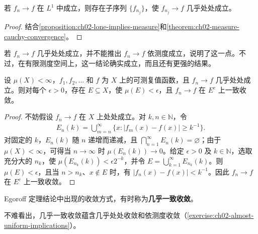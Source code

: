 \documentclass[../../main.tex]{subfiles}%
\begin{document}
\begin{corollary}\label{corollary:ch02-lone-ae-subsequence}
若 $f_n\to f$ 在 $L^1$ 中成立，则存在子序列 $\{f_{n_j}\}$，使 $f_{n_j}\to f$ 几乎处处成立。
\end{corollary}
\begin{proof}
结合\cref{proposition:ch02-lone-implies-measure}和\cref{theorem:ch02-measure-cauchy-convergence}。
\end{proof}
若 $f_n\to f$ 几乎处处成立，并不能推出 $f_n\to f$ 依测度成立，说明了这一点。不过，在有限测度空间上，这一结论确实成立，而且还有更强的结果。
\begin{theorem}[Egoroff 定理]\label{theorem:ch02-egoroff}
设 $\mu(X)<\infty$，$f_1,f_2,\ldots$ 和 $f$ 为 $X$ 上的可测复值函数，且 $f_n\to f$ 几乎处处成立。则对每个 $\epsilon>0$，存在 $E\subseteq X$，使 $\mu(E)<\epsilon$，且 $f_n\to f$ 在 $E^c$ 上一致收敛。
\end{theorem}
\begin{proof}
不妨假设 $f_n\to f$ 在 $X$ 上处处成立。对 $k,n\in\mathbb{N}$，令
\begin{align*}
E_n(k)=\bigcup_{m=n}^\infty\{x:|f_m(x)-f(x)|\ge k^{-1}\}.
\end{align*}
对固定的 $k$，$E_n(k)$ 随 $n$ 递增而递减，且 $\bigcap_{n=1}^\infty E_n(k)=\varnothing$；由于 $\mu(X)<\infty$，可得当 $n\to\infty$ 时 $\mu(E_n(k))\to0$。给定 $\epsilon>0$ 及 $k\in\mathbb{N}$，选取充分大的 $n_k$，使 $\mu(E_{n_k}(k))<\epsilon2^{-k}$，并令 $E=\bigcup_{k=1}^\infty E_{n_k}(k)$。则 $\mu(E)<\epsilon$，且当 $n>n_k$、$x\notin E$ 时，有 $|f_n(x)-f(x)|<k^{-1}$。因此 $f_n\to f$ 在 $E^c$ 上一致收敛。
\end{proof}
\begin{definition}[几乎一致收敛]\label{definition:ch02-almost-uniform}
Egoroff 定理结论中出现的收敛方式，有时称为\textbf{几乎一致收敛}。
\end{definition}
\begin{proposition}\label{proposition:ch02-almost-uniform-implications}
不难看出，几乎一致收敛蕴含几乎处处收敛和依测度收敛（\cref{exercise:ch02-almost-uniform-implications}）。
\end{proposition}
\end{document}
